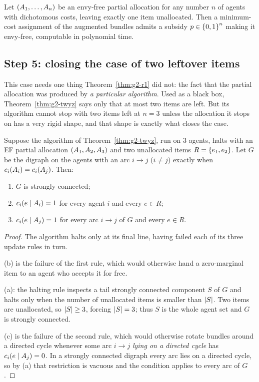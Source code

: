 \begin{corollary}
\label{cor:g2-anyn}
Let $(A_{1},\dots,A_{n})$ be an envy-free partial allocation for any
number $n$ of agents with dichotomous costs, leaving exactly one item
unallocated. Then a minimum-cost assignment of the augmented bundles admits
a subsidy $p \in \left\{0,1\right\}^n$ making it envy-free, computable in
polynomial time.
\end{corollary}

\subsection{Step 5: closing the case of two leftover items}
\label{sec:g2-r2}

This case needs one thing Theorem~\ref{thm:g2-r1} did not: the fact that the
partial allocation was produced by \emph{a particular algorithm}. Used as a
black box, Theorem~\ref{thm:g2-twyz} says only that at most two items are left. But
its algorithm cannot stop with two items left at $n = 3$ unless the
allocation it stops on has a very rigid shape, and that shape is exactly
what closes the case.

\begin{lemma}
\label{lem:g2-stopping}
Suppose the algorithm of Theorem~\ref{thm:g2-twyz}, run on $3$ agents, halts with an
EF partial allocation $(A_{1},A_{2},A_{3})$ and two unallocated
items $R = \left\{e_1,e_2\right\}$. Let $G$ be the digraph on the agents with an arc
$i \to j$ ($i \ne j$) exactly when $c_i(A_{i}) = c_i(A_{j})$.
Then:
\begin{enumerate}
  \item[(a)] $G$ is strongly connected;
  \item[(b)] $c_i(e \mid A_{i}) = 1$ for every agent $i$ and every
        $e \in R$;
  \item[(c)] $c_i(e \mid A_{j}) = 1$ for every arc $i \to j$ of $G$
        and every $e \in R$.
\end{enumerate}
\end{lemma}
\begin{proof}
The algorithm halts only at its final line, having failed each of its three
update rules in turn.

(b) is the failure of the first rule, which would otherwise hand a
zero-marginal item to an agent who accepts it for free.

(a): the halting rule inspects a tail strongly connected component $S$ of
$G$ and halts only when the number of unallocated items is smaller than
$\left\lvert S\right\rvert$. Two items are unallocated, so $\left\lvert S\right\rvert \ge 3$, forcing $\left\lvert S\right\rvert = 3$;
thus $S$ is the whole agent set and $G$ is strongly connected.

(c) is the failure of the second rule, which would otherwise rotate bundles
around a directed cycle whenever some arc $i \to j$ \emph{lying on a
directed cycle} has $c_i(e \mid A_{j}) = 0$. In a strongly connected
digraph every arc lies on a directed cycle, so by (a) that restriction is
vacuous and the condition applies to every arc of $G$.
\end{proof}

